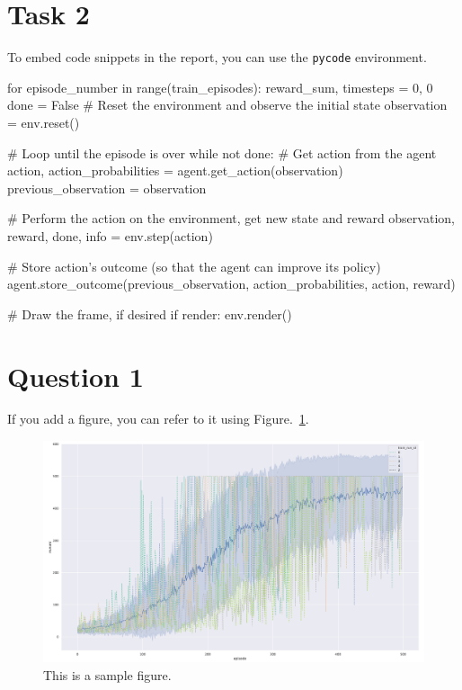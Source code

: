 \documentclass[12pt]{article}
\begin{document}
\section{Task 2}
To embed code snippets in the report, you can use the \texttt{pycode} environment.

\begin{pycode}
for episode_number in range(train_episodes):
    reward_sum, timesteps = 0, 0
    done = False
    # Reset the environment and observe the initial state
    observation = env.reset()

    # Loop until the episode is over
    while not done:
        # Get action from the agent
        action, action_probabilities = agent.get_action(observation)
        previous_observation = observation

        # Perform the action on the environment, get new state and reward
        observation, reward, done, info = env.step(action)

        # Store action's outcome (so that the agent can improve its policy)
        agent.store_outcome(previous_observation, action_probabilities, action, reward)

        # Draw the frame, if desired
        if render:
            env.render()
\end{pycode}

\section{Question 1}

If you add a figure, you can refer to it using Figure.~\ref*{fig:fig1}.

\begin{figure}[h] 
	\centering  %
    \includegraphics[width=0.9\columnwidth]{img/training.pdf}
	\caption{This is a sample figure.}
	\label{fig:fig1}
\end{figure}


\end{document}
